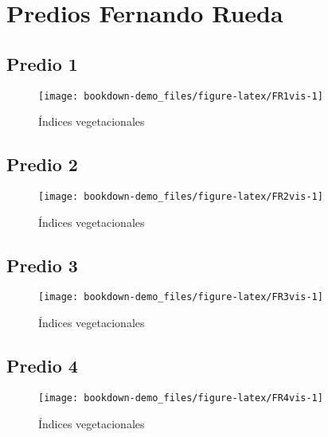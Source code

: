 \documentclass[]{report}
\begin{document}
\section{Predios Fernando Rueda}\label{predios-fernando-rueda-1}

\subsection{Predio 1}\label{predio-1-1}

\begin{figure}

{\centering \texttt{[image: bookdown-demo\_files/figure-latex/FR1vis-1]} 

}

\caption{Índices vegetacionales}\label{fig:FR1vis}
\end{figure}

\subsection{Predio 2}\label{predio-2-1}

\begin{figure}

{\centering \texttt{[image: bookdown-demo\_files/figure-latex/FR2vis-1]} 

}

\caption{Índices vegetacionales}\label{fig:FR2vis}
\end{figure}

\subsection{Predio 3}\label{predio-3-1}

\begin{figure}

{\centering \texttt{[image: bookdown-demo\_files/figure-latex/FR3vis-1]} 

}

\caption{Índices vegetacionales}\label{fig:FR3vis}
\end{figure}

\subsection{Predio 4}\label{predio-4-1}

\begin{figure}

{\centering \texttt{[image: bookdown-demo\_files/figure-latex/FR4vis-1]} 

}

\caption{Índices vegetacionales}\label{fig:FR4vis}
\end{figure}
\end{document}
